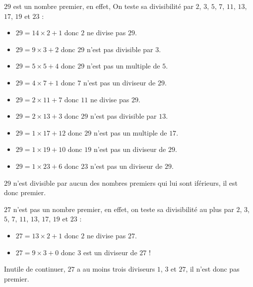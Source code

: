 \begin{exemple*1}
$29$ est un nombre premier, en effet, On teste sa divisibilité par $2$, $3$, $5$, $7$, $11$, $13$, $17$, $19$ et $23$ :
\begin{itemize}
	\item $29=14\times 2+1$ donc $2$ ne divise pas $29$.
	\item $29=9\times 3+2$ donc $29$ n'est pas divisible par $3$.
	\item $29=5\times 5+4$ donc $29$ n'est pas un multiple de $5$.
	\item $29=4\times 7+1$ donc $7$ n'est pas un diviseur de $29$.
	\item $29=2\times 11+7$ donc $11$ ne divise pas $29$.
	\item $29=2\times 13+3$ donc $29$ n'est pas divisible par $13$.
	\item $29=1\times 17+12$ donc $29$ n'est pas un multiple de $17$.
	\item $29=1\times 19+10$ donc $19$ n'est pas un diviseur de $29$.
	\item $29=1\times 23+6$ donc $23$ n'est pas un diviseur de $29$.
\end{itemize}

$29$ n'est divisible par aucun des nombres premiers qui lui sont iférieurs, il est donc premier.
\end{exemple*1}

\begin{exemple*1}
	$27$ n'est pas un nombre premier, en effet, on teste sa divisibilité au plus par $2$, $3$, $5$, $7$, $11$, $13$, $17$, $19$ et $23$ :
	\begin{itemize}
		\item $27=13\times 2+1$ donc $2$ ne divise pas $27$.
		\item $27=9\times 3+0$ donc 3 est un diviseur de $27$ !
	\end{itemize}
Inutile de continuer, $27$ a au moins trois diviseurs $1$, $3$ et $27$, il n'est donc pas premier.
\end{exemple*1}